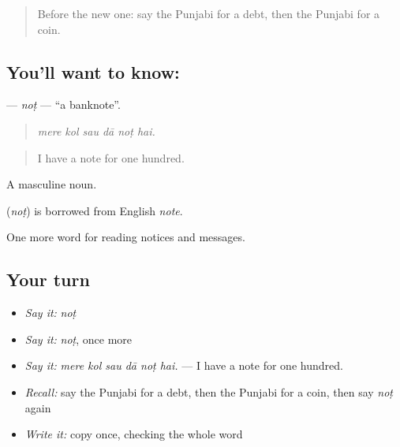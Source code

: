 \label{lesson:PA-C258-not}



\begin{quote}
Before the new one: say the Punjabi for a debt, then the Punjabi for a coin.
\end{quote}

\subsection*{You'll want to know: }
\textbf{} — \emph{noṭ} — \textquotedblleft{}a banknote\textquotedblright{}.

\begin{quote}
     
\end{quote}

\begin{quote}
\emph{mere kol sau dā noṭ hai.}
\end{quote}

\begin{quote}
I have a note for one hundred.
\end{quote}

A masculine noun.

\begin{cousinweb}
\textbf{} (\emph{noṭ}) is borrowed from English \emph{note}.
\end{cousinweb}

\begin{grammarlens}[title={What you've built}]
One more word for reading notices and messages.
\end{grammarlens}

\subsection*{Your turn}
\begin{itemize}
\raggedright
  \item \emph{Say it:} \emph{noṭ}
  \item \emph{Say it:} \emph{noṭ}, once more
  \item \emph{Say it:} \emph{mere kol sau dā noṭ hai.} — I have a note for one hundred.
  \item \emph{Recall:} say the Punjabi for a debt, then the Punjabi for a coin, then say \emph{noṭ} again
  \item \emph{Write it:} copy \textbf{} once, checking the whole word
\end{itemize}

